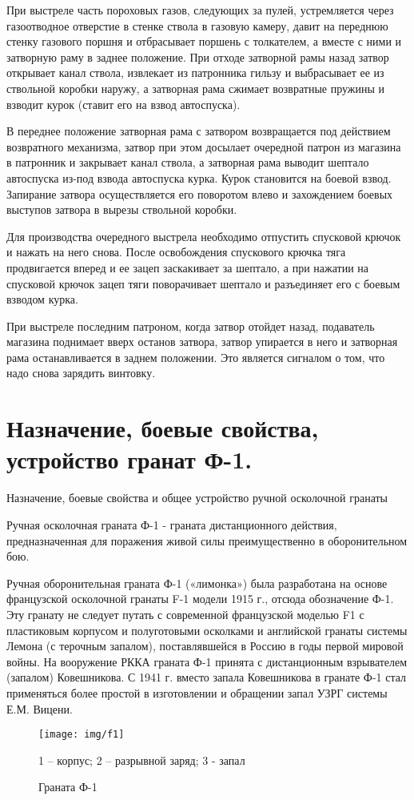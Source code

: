 \documentclass[12pt,a4paper]{report}
\begin{document}
При выстреле часть пороховых газов, следующих за пулей, устремляется через газоотводное отверстие в стенке ствола в газовую камеру, давит на переднюю стенку газового поршня и отбрасывает поршень с толкателем, а вместе с ними и затворную раму в заднее положение. При отходе затворной рамы назад затвор открывает канал ствола, извлекает из патронника гильзу и выбрасывает ее из ствольной коробки наружу, а затворная рама сжимает возвратные пружины и взводит курок (ставит его на взвод автоспуска).

В переднее положение затворная рама с затвором возвращается под действием возвратного механизма, затвор при этом досылает очередной патрон из магазина в патронник и закрывает канал ствола, а затворная рама выводит шептало автоспуска из-под взвода автоспуска курка. Курок становится на боевой взвод. Запирание затвора осуществляется его поворотом влево и захождением боевых выступов затвора в вырезы ствольной коробки.

Для производства очередного выстрела необходимо отпустить спусковой крючок и нажать на него снова. После освобождения спускового крючка тяга продвигается вперед и ее зацеп заскакивает за шептало, а при нажатии на спусковой крючок зацеп тяги поворачивает шептало и разъединяет его с боевым взводом курка.

При выстреле последним патроном, когда затвор отойдет назад, подаватель магазина поднимает вверх останов затвора, затвор упирается в него и затворная рама останавливается в заднем положении. Это является сигналом о том, что надо снова зарядить винтовку.
\section{Назначение, боевые свойства, устройство гранат Ф-1.}
Назначение, боевые свойства и общее устройство ручной осколочной гранаты 

Ручная осколочная граната Ф-1 - граната дистанционного действия, предназначенная для поражения живой силы преимущественно в оборонительном бою.

Ручная оборонительная граната Ф-1 («лимонка») была разработана на основе французской осколочной гранаты F-1 модели 1915 г., отсюда обозначение Ф-1. Эту гранату не следует путать с современной французской моделью F1 с пластиковым корпусом и полуготовыми осколками и английской гранаты системы Лемона (с терочным запалом), поставлявшейся в Россию в годы первой мировой войны. На вооружение РККА граната Ф-1 принята с дистанционным взрывателем (запалом) Ковешникова. С 1941 г. вместо запала Ковешникова в гранате Ф-1 стал применяться более простой в изготовлении и обращении запал УЗРГ системы Е.М. Вицени.
\begin{figure}[h]
\centering
\texttt{[image: img/f1]}
\caption{Граната Ф-1 }
1 – корпус; 2 – разрывной заряд; 3 - запал
\label{fig:f1}
\end{figure}
\end{document}
